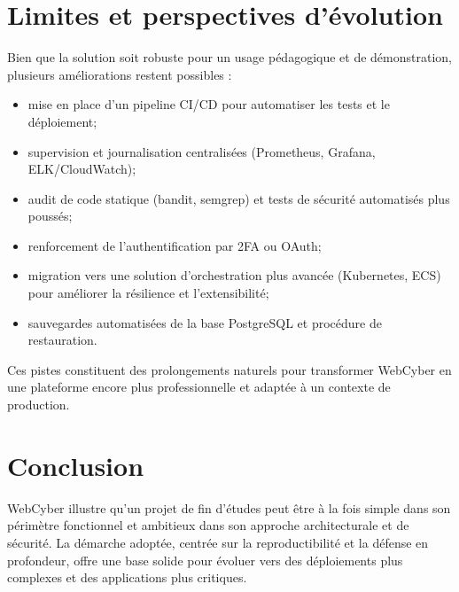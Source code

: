 \section{Limites et perspectives d'évolution}

Bien que la solution soit robuste pour un usage pédagogique et de démonstration,
plusieurs améliorations restent possibles :

\begin{itemize}
  \item mise en place d'un pipeline CI/CD pour automatiser les tests et le
        déploiement;
  \item supervision et journalisation centralisées (Prometheus, Grafana,
        ELK/CloudWatch);
  \item audit de code statique (bandit, semgrep) et tests de sécurité
        automatisés plus poussés;
  \item renforcement de l'authentification par 2FA ou OAuth;
  \item migration vers une solution d'orchestration plus avancée (Kubernetes,
        ECS) pour améliorer la résilience et l'extensibilité;
  \item sauvegardes automatisées de la base PostgreSQL et procédure de
        restauration.
\end{itemize}

Ces pistes constituent des prolongements naturels pour transformer WebCyber
en une plateforme encore plus professionnelle et adaptée à un contexte de
production.

\section{Conclusion}

WebCyber illustre qu'un projet de fin d'études peut être à la fois simple dans
son périmètre fonctionnel et ambitieux dans son approche architecturale et de
sécurité. La démarche adoptée, centrée sur la reproductibilité et la défense en
profondeur, offre une base solide pour évoluer vers des déploiements plus
complexes et des applications plus critiques.

